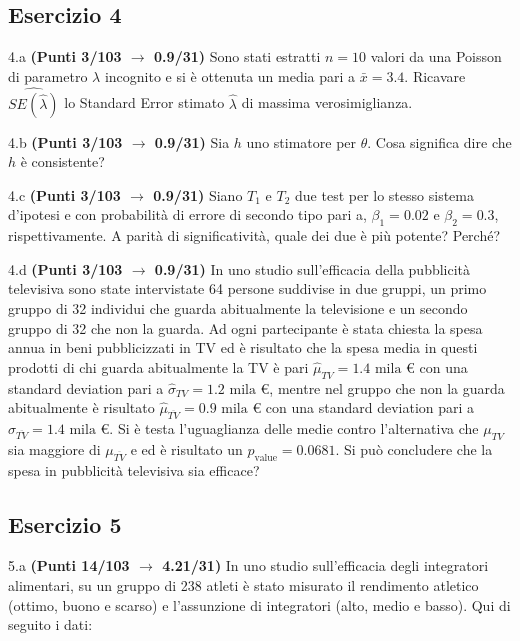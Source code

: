 \documentclass[
  11pt,
]{book}
\theoremstyle{mytheoremstyle}
\theoremstyle{mydefstyle}
\begin{document}
\subsection{Esercizio 4}\label{esercizio-4-25}

4.a \textbf{(Punti 3/103 \(\rightarrow\) 0.9/31)} Sono stati estratti \(n=10\) valori da una Poisson di parametro \(\lambda\) incognito e si è ottenuta un media pari a \(\bar x=3.4\). Ricavare \(\widehat{SE(\hat\lambda)}\) lo Standard Error stimato \(\hat\lambda\) di massima verosimiglianza.

4.b \textbf{(Punti 3/103 \(\rightarrow\) 0.9/31)} Sia \(h\) uno stimatore per \(\theta\). Cosa significa dire che \(h\) è consistente?

4.c \textbf{(Punti 3/103 \(\rightarrow\) 0.9/31)} Siano \(T_1\) e \(T_2\) due test per lo stesso sistema d'ipotesi e con probabilità di errore di secondo tipo pari a, \(\beta_1=0.02\) e \(\beta_2=0.3\), rispettivamente. A parità di significatività, quale dei due è più potente? Perché?

4.d \textbf{(Punti 3/103 \(\rightarrow\) 0.9/31)} In uno studio sull'efficacia della pubblicità televisiva sono state intervistate 64 persone suddivise in due gruppi, un primo gruppo di 32 individui che guarda abitualmente la televisione e un secondo gruppo di 32 che non la guarda. Ad ogni partecipante è stata chiesta la spesa annua in beni pubblicizzati in TV ed è risultato che la spesa media in questi prodotti di chi guarda abitualmente la TV è pari \(\hat\mu_{TV}=1.4\text{ mila €}\) con una standard deviation pari a \(\hat\sigma_{TV}=1.2\text{ mila €}\), mentre nel gruppo che non la guarda abitualmente è risultato \(\hat\mu_{\overline{TV}}=0.9\text{ mila €}\) con una standard deviation pari a \(\hat\sigma_{\overline{TV}}=1.4\text{ mila €}\). Si è testa l'uguaglianza delle medie contro l'alternativa che \(\mu_{TV}\) sia maggiore di \(\mu_{\overline{TV}}\) e ed è risultato un \(p_\text{value}= 0.0681\). Si può concludere che la spesa in pubblicità televisiva sia efficace?

\subsection{Esercizio 5}\label{esercizio-5-24}

5.a \textbf{(Punti 14/103 \(\rightarrow\) 4.21/31)} In uno studio sull'efficacia degli integratori alimentari, su un gruppo di 238 atleti è stato misurato il rendimento atletico (ottimo, buono e scarso) e l'assunzione di integratori (alto, medio e basso). Qui di seguito i dati:
\end{document}
